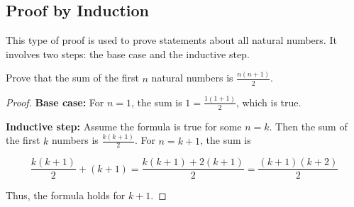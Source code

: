 \documentclass{article}
\theoremstyle{mytheoremstyle}
\theoremstyle{mytheoremstyle}
\theoremstyle{myexamplestyle}
\begin{document}
\subsection{Proof by Induction}

This type of proof is used to prove statements about all natural numbers. It involves two steps: the base case and the inductive step.

\begin{example}
    Prove that the sum of the first \( n \) natural numbers is
    \( \displaystyle\frac{n(n+1)}{2} \).

    \begin{proof}

        \textbf{Base case:} For \( n = 1 \), the sum is
        \(\displaystyle 1 = \frac{1(1+1)}{2} \), which is true.

        \textbf{Inductive step:} Assume the formula is true for some \( n = k \). Then the sum of the first \( k \) numbers is \(\displaystyle \frac{k(k+1)}{2} \). For \( n = k+1 \), the sum is

        \[\frac{k(k+1)}{2} + (k+1) = \frac{k(k+1) + 2(k+1)}{2} = \frac{(k+1)(k+2)}{2}\]

        Thus, the formula holds for \( k+1 \).
    \end{proof}
\end{example}
\end{document}
